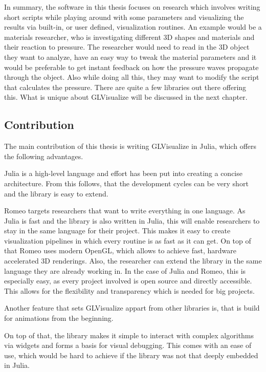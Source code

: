 In summary, the software in this thesis focuses on research which involves writing short scripts while playing around with some parameters and visualizing the results via built-in, or user defined, visualization routines.
An example would be a materials researcher, who is investigating different 3D shapes and materials and their reaction to pressure.
The researcher would need to read in the 3D object they want to analyze, have an easy way to tweak the material parameters and it would be preferable to get instant feedback on how the pressure waves propagate through the object. Also while doing all this, they may want to modify the script that calculates the pressure.
There are quite a few libraries out there offering this. What is unique about GLVisualize will be discussed in the next chapter.


\subsection{Contribution}

The main contribution of this thesis is writing GLVisualize in Julia, which offers the following advantages.

Julia is a high-level language and effort has been put into creating a concise architecture. From this follows, that the development cycles can be very short and the library is easy to extend.

Romeo targets researchers that want to write everything in one language.
As Julia is fast and the library is also written in Julia, this will enable researchers to stay in the same language for their project. 
This makes it easy to create visualization pipelines in which every routine is as fast as it can get. 
On top of that Romeo uses modern \ac{OpenGL}, which allows to achieve fast, hardware accelerated 3D renderings.
Also, the researcher can extend the library in the same language they are already working in. 
In the case of Julia and Romeo, this is especially easy, as every project involved is open source and directly accessible.
This allows for the flexibility and transparency which is needed for big projects.

Another feature that sets GLVisualize appart from other libraries is, that is build for animations from the beginning.

On top of that, the library makes it simple to interact with complex algorithms via widgets and forms a basis for visual debugging. 
This comes with an ease of use, which would be hard to achieve if the library was not that deeply embedded in Julia.


